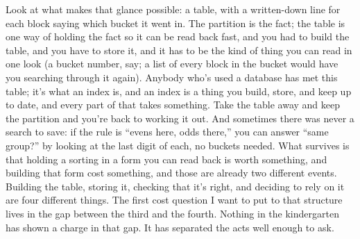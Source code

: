 \documentclass[11pt,twoside]{article}
\theoremstyle{thielethm}
\theoremstyle{thieledef}
\theoremstyle{thieledef}
\theoremstyle{thieledef}
\theoremstyle{thielethm}
\theoremstyle{thieleobs}
\theoremstyle{thielethm}
\begin{document}
Look at what makes that glance possible: a table, with a written-down line for each block saying which bucket it went in. The partition is the fact; the table is one way of holding the fact so it can be read back fast, and you had to build the table, and you have to store it, and it has to be the kind of thing you can read in one look (a bucket number, say; a list of every block in the bucket would have you searching through it again). Anybody who's used a database has met this table; it's what an index is, and an index is a thing you build, store, and keep up to date, and every part of that takes something. Take the table away and keep the partition and you're back to working it out. And sometimes there was never a search to save: if the rule is ``evens here, odds there,'' you can answer ``same group?'' by looking at the last digit of each, no buckets needed. What survives is that holding a sorting in a form you can read back is worth something, and building that form cost something, and those are already two different events. Building the table, storing it, checking that it's right, and deciding to rely on it are four different things. The first cost question I want to put to that structure lives in the gap between the third and the fourth. Nothing in the kindergarten has shown a charge in that gap. It has separated the acts well enough to ask.
\end{document}
